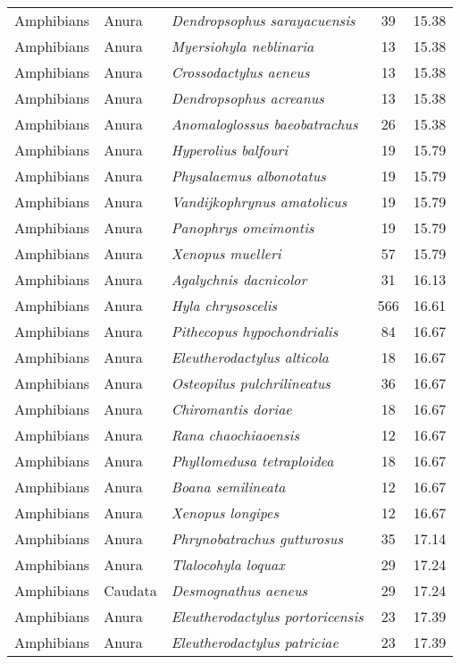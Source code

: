 \begin{longtable}{ll>{\itshape}lcc}
  Amphibians & Anura & Dendropsophus sarayacuensis &  39 & 15.38 \\ 
  Amphibians & Anura & Myersiohyla neblinaria &  13 & 15.38 \\ 
  Amphibians & Anura & Crossodactylus aeneus &  13 & 15.38 \\ 
  Amphibians & Anura & Dendropsophus acreanus &  13 & 15.38 \\ 
  Amphibians & Anura & Anomaloglossus baeobatrachus &  26 & 15.38 \\ 
  Amphibians & Anura & Hyperolius balfouri &  19 & 15.79 \\ 
  Amphibians & Anura & Physalaemus albonotatus &  19 & 15.79 \\ 
  Amphibians & Anura & Vandijkophrynus amatolicus &  19 & 15.79 \\ 
  Amphibians & Anura & Panophrys omeimontis &  19 & 15.79 \\ 
  Amphibians & Anura & Xenopus muelleri &  57 & 15.79 \\ 
  Amphibians & Anura & Agalychnis dacnicolor &  31 & 16.13 \\ 
  Amphibians & Anura & Hyla chrysoscelis & 566 & 16.61 \\ 
  Amphibians & Anura & Pithecopus hypochondrialis &  84 & 16.67 \\ 
  Amphibians & Anura & Eleutherodactylus alticola &  18 & 16.67 \\ 
  Amphibians & Anura & Osteopilus pulchrilineatus &  36 & 16.67 \\ 
  Amphibians & Anura & Chiromantis doriae &  18 & 16.67 \\ 
  Amphibians & Anura & Rana chaochiaoensis &  12 & 16.67 \\ 
  Amphibians & Anura & Phyllomedusa tetraploidea &  18 & 16.67 \\ 
  Amphibians & Anura & Boana semilineata &  12 & 16.67 \\ 
  Amphibians & Anura & Xenopus longipes &  12 & 16.67 \\ 
  Amphibians & Anura & Phrynobatrachus gutturosus &  35 & 17.14 \\ 
  Amphibians & Anura & Tlalocohyla loquax &  29 & 17.24 \\ 
  Amphibians & Caudata & Desmognathus aeneus &  29 & 17.24 \\ 
  Amphibians & Anura & Eleutherodactylus portoricensis &  23 & 17.39 \\ 
  Amphibians & Anura & Eleutherodactylus patriciae &  23 & 17.39 \\ 

\end{longtable}
